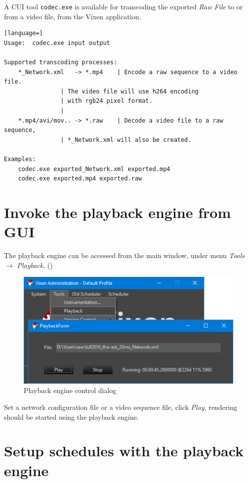 A CUI tool \texttt{codec.exe} is available for transcoding the exported \textit{Raw File} to or from a video file,  from the Vixen application.

\renewcommand{\baselinestretch}{1}
\begin{lstlisting}[language=]
Usage:  codec.exe input output

Supported transcoding processes:
    *_Network.xml   -> *.mp4	| Encode a raw sequence to a video file.
				| The video file will use h264 encoding
				| with rgb24 pixel format.
				|
    *.mp4/avi/mov.. -> *.raw	| Decode a video file to a raw sequence,
				| *_Network.xml will also be created.

Examples:
    codec.exe exported_Network.xml exported.mp4
    codec.exe exported.mp4 exported.raw
\end{lstlisting}
\renewcommand{\baselinestretch}{\mystretch}

\section{Invoke the playback engine from GUI}

The playback engine can be accessed from the main window, under menu \textit{Tools} $\rightarrow$ \textit{Playback}. ()

\begin{figure}[!htb]
  \centering
  \includegraphics[width=0.7\columnwidth]{Figs/vixen_playback.png}
  \caption{\footnotesize Playback engine control dialog}
  \label{fig:guide_playback}
\end{figure}

Set a network configuration file or a video sequence file, click \textit{Play}, rendering should be started using the playback engine.

\section{Setup schedules with the playback engine}

